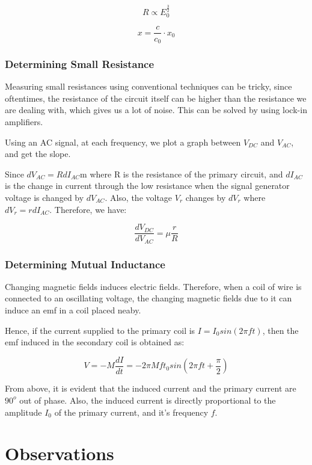 \documentclass[a4paper]{article}
\begin{document}
$$R\propto E_0^{\frac{3}{2}}$$

$$x=\frac{c}{c_0}\cdot x_0$$


\subsubsection*{Determining Small Resistance}

Measuring small resistances using conventional techniques can be tricky, since oftentimes, the resistance of the circuit itself can be higher than the resistance we are dealing with, which gives us a lot of noise. This can be solved by using lock-in amplifiers.

Using an AC signal, at each frequency, we plot a graph between $V_{DC}$ and $V_{AC}$, and get the slope.

Since $dV_{AC}=RdI_{AC}$m where R is the resistance of the primary circuit, and $dI_{AC}$ is the change in current through the low resistance when the signal generator voltage is changed by $dV_{AC}$. Also, the voltage $V_r$ changes by $dV_r$ where $dV_r=rdI_{AC}$. Therefore, we have:

$$
\frac{dV_{DC}}{dV_{AC}}=\mu \frac{r}{R}
$$



\subsubsection*{Determining Mutual Inductance}

Changing magnetic fields induces electric fields. Therefore, when a coil of wire is connected to an oscillating voltage, the changing magnetic fields due to it can induce an emf in a coil placed neaby.

Hence, if the current supplied to the primary coil is $ I=I_0sin(2\pi f t)$,
then the emf induced in the secondary coil is obtained as:

$$
V=-M\frac{dI}{dt}= -2\pi Mft_0 sin(2\pi f t+\frac{\pi}{2})
$$

From above, it is evident that the induced current and the primary current are $90^o$ out of phase. Also, the induced current is directly proportional to the amplitude $I_0$ of the primary current, and it's frequency $f$.

\section*{Observations}
\end{document}
